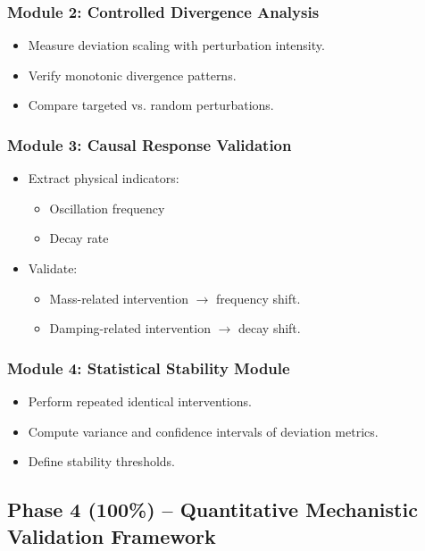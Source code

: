 \documentclass[12pt,singleside,a4paper]{article}
\begin{document}
\subsubsection*{Module 2: Controlled Divergence Analysis}
\begin{itemize}
    \item Measure deviation scaling with perturbation intensity.
    \item Verify monotonic divergence patterns.
    \item Compare targeted vs. random perturbations.
\end{itemize}

\subsubsection*{Module 3: Causal Response Validation}
\begin{itemize}
    \item Extract physical indicators:
    \begin{itemize}
        \item Oscillation frequency
        \item Decay rate
    \end{itemize}
    \item Validate:
    \begin{itemize}
        \item Mass-related intervention $\rightarrow$ frequency shift.
        \item Damping-related intervention $\rightarrow$ decay shift.
    \end{itemize}
\end{itemize}

\subsubsection*{Module 4: Statistical Stability Module}
\begin{itemize}
    \item Perform repeated identical interventions.
    \item Compute variance and confidence intervals of deviation metrics.
    \item Define stability thresholds.
\end{itemize}

\vspace{0.5cm}

\subsection{Phase 4 (100\%) -- Quantitative Mechanistic Validation
Framework}
\end{document}
